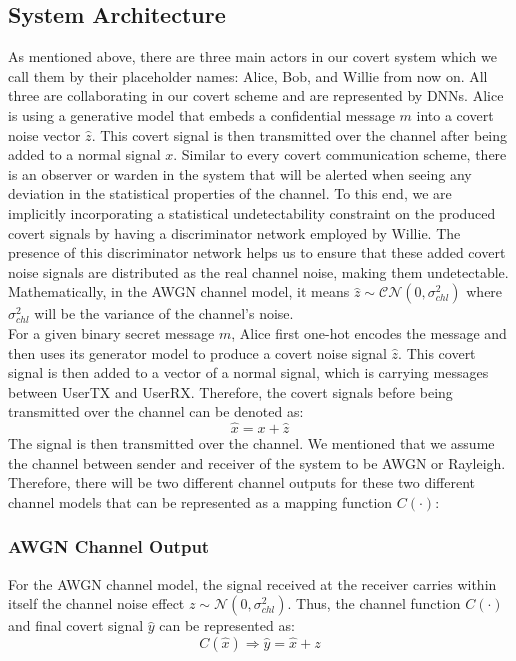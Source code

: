 \subsection{System Architecture}
As mentioned above, there are three main actors in our covert system which we call them by their placeholder names: Alice, Bob, and Willie from now on. All three are collaborating in our covert scheme and are represented by DNNs. Alice is using a generative model that embeds a confidential message \(m\) into a covert noise vector \(\hat{z}\). This covert signal is then transmitted over the channel after being added to a normal signal \(x\). Similar to every covert communication scheme, there is an observer or warden in the system that will be alerted when seeing any deviation in the statistical properties of the channel. To this end, we are implicitly incorporating a statistical undetectability constraint on the produced covert signals by having a discriminator network employed by Willie. The presence of this discriminator network helps us to ensure that these added covert noise signals are distributed as the real channel noise, making them undetectable. Mathematically, in the AWGN channel model, it means \(\hat{z} \sim \mathcal{CN}(0, \sigma_{chl}^2)\) where \(\sigma_{chl}^2\) will be the variance of the channel's noise.\\
For a given binary secret message \(m\), Alice first one-hot encodes the message and then uses its generator model to produce a covert noise signal \(\hat{z}\). This covert signal is then added to a vector of a normal signal, which is carrying messages between UserTX and UserRX. Therefore, the covert signals before being transmitted over the channel can be denoted as:
\begin{equation}
	\hat{x} = x + \hat{z}
\end{equation}
The signal is then transmitted over the channel. We mentioned that we assume the channel between sender and receiver of the system to be AWGN or Rayleigh. Therefore, there will be two different channel outputs for these two different channel models that can be represented as a mapping function \(C(\cdot)\):
\subsubsection{AWGN Channel Output}
For the AWGN channel model, the signal received at the receiver carries within itself the channel noise effect \(z \sim \mathcal{N}(0, \sigma_{chl}^2)\). Thus, the channel function \(C(\cdot)\) and final covert signal \(\hat{y}\) can be represented as:
\begin{equation}
	C(\hat{x}) \Rightarrow \hat{y} = \hat{x} + z
\end{equation}

